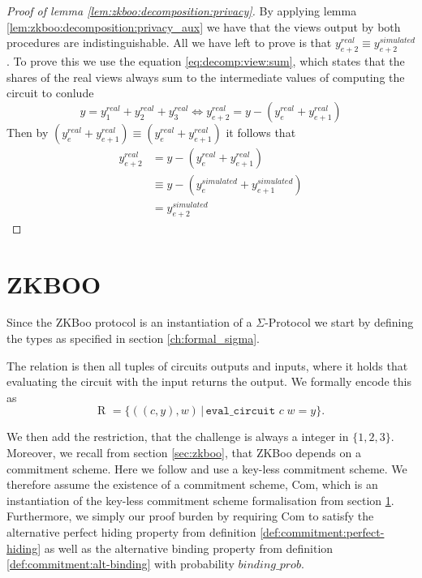 \begin{proof}[Proof of lemma \ref{lem:zkboo:decomposition:privacy}]
  By applying lemma \ref{lem:zkboo:decomposition:privacy_aux} we have that the
  views output by both procedures are indistinguishable. All we have left to prove
  is that $y^{real}_{e+2} \equiv y^{simulated}_{e+2}$. To prove this we use the
  equation \ref{eq:decomp:view:sum}, which states that the shares of the real views always sum to
  the intermediate values of computing the circuit to conlude
  \[
  y = y^{real}_{1} + y^{real}_{2} + y^{real}_{3} \iff y^{real}_{e+2} = y - (y^{real}_{e} + y^{real}_{e+1})
  \]
  Then by
  $(y^{real}_{e} + y^{real}_{e+1}) \equiv (y^{real}_{e} + y^{real}_{e+1})$ it
  follows that
  \begin{align*}
    y^{real}_{e+2} &= y - (y^{real}_{e} + y^{real}_{e+1}) \\
                      &\equiv y - (y^{simulated}_{e} + y^{simulated}_{e+1}) \\
                      &= y^{simulated}_{e+2}
  \end{align*}
\end{proof}


\section{ZKBOO}
\label{sec:formal_zkboo}
Since the ZKBoo protocol is an instantiation of a $\Sigma$-Protocol we start by
defining the types as specified in section \ref{ch:formal_sigma}.




The relation is then all tuples of circuits outputs and inputs, where it holds that evaluating the circuit with the input returns the output. We formally encode this as
\begin{equation}
  \text{R } = \{((c,y), w) \,|\, \texttt{eval\_circuit } c \; w = y\}.
\end{equation}

We then add the restriction, that the challenge is always a integer in
$\{1,2,3\}$. Moreover, we recall from section \ref{sec:zkboo}, that ZKBoo
depends on a commitment scheme. Here we follow \cite{zkboo} and use a key-less
commitment scheme. We therefore assume the existence of a commitment scheme,
Com, which is an instantiation of the key-less commitment scheme formalisation
from section \ref{sec:formal_zkboo}. Furthermore, we simply our proof burden by
requiring Com to satisfy the alternative perfect hiding property from definition
\ref{def:commitment:perfect-hiding} as well as the alternative binding property
from definition \ref{def:commitment:alt-binding} with probability $binding\_prob$.

